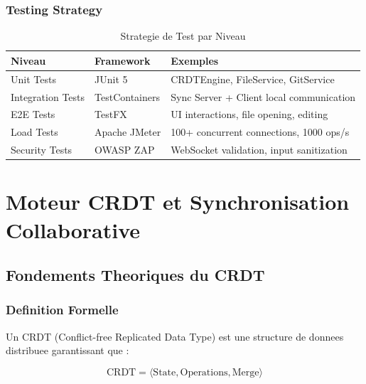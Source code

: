 \documentclass[11pt,a4paper,hidelinks]{book}
\begin{document}
\subsection{Testing Strategy}

\begin{table}[H]
\centering
\caption{Strategie de Test par Niveau}
\begin{tabularx}{\textwidth}{l l X}
\toprule
\textbf{Niveau} & \textbf{Framework} & \textbf{Exemples} \\
\midrule
Unit Tests & JUnit 5 & CRDTEngine, FileService, GitService \\
Integration Tests & TestContainers & Sync Server + Client local communication \\
E2E Tests & TestFX & UI interactions, file opening, editing \\
Load Tests & Apache JMeter & 100+ concurrent connections, 1000 ops/s \\
Security Tests & OWASP ZAP & WebSocket validation, input sanitization \\
\bottomrule
\end{tabularx}
\end{table}


\chapter{Moteur CRDT et Synchronisation Collaborative}

\section{Fondements Theoriques du CRDT}

\subsection{Definition Formelle}

Un CRDT (Conflict-free Replicated Data Type) est une structure de donnees distribuee garantissant que :

\begin{equation}
\text{CRDT} = \langle \text{State}, \text{Operations}, \text{Merge} \rangle
\end{equation}
\end{document}
